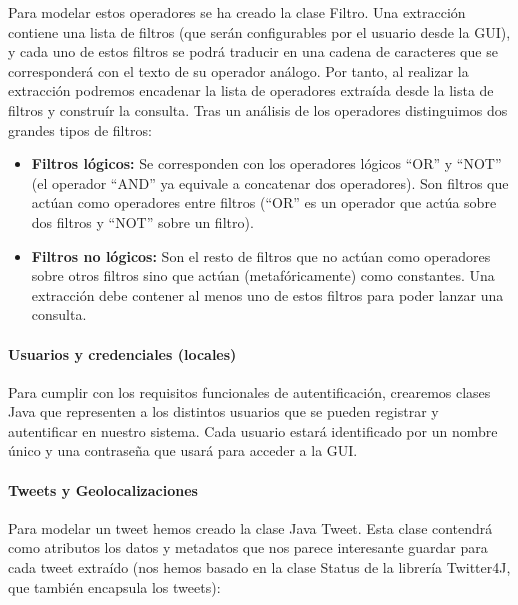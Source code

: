 Para modelar estos operadores se ha creado la clase Filtro. Una extracción contiene una lista de filtros (que serán configurables por el usuario desde la GUI), y cada uno de estos filtros se podrá traducir en una cadena de caracteres que se corresponderá con el texto de su operador análogo.
Por tanto, al realizar la extracción podremos encadenar la lista de operadores extraída desde la lista de filtros y construír la consulta. 
Tras un análisis de los operadores distinguimos dos grandes tipos de filtros:

\begin{itemize}
\item \textbf{Filtros lógicos:} Se corresponden con los operadores lógicos ``OR'' y ``NOT'' (el operador ``AND'' ya equivale a concatenar dos operadores). Son filtros que actúan como operadores entre filtros (``OR'' es un operador que actúa sobre dos filtros y ``NOT'' sobre un filtro).
\item\textbf{Filtros no lógicos:} Son el resto de filtros que no actúan como operadores sobre otros filtros sino que actúan (metafóricamente) como constantes. Una extracción debe contener al menos uno de estos filtros para poder lanzar una consulta. 
\end{itemize}

\paragraph{Usuarios y credenciales (locales)}
Para cumplir con los requisitos funcionales de autentificación, crearemos clases Java que representen a los distintos usuarios que se pueden registrar y autentificar en nuestro sistema. Cada usuario estará identificado por un nombre único y una contraseña que usará para acceder a la GUI.
\paragraph{Tweets y Geolocalizaciones}
Para modelar un tweet hemos creado la clase Java Tweet. Esta clase contendrá como atributos los datos y metadatos que nos parece interesante guardar para cada tweet extraído (nos hemos basado en la clase Status de la librería Twitter4J, que también encapsula los tweets):


